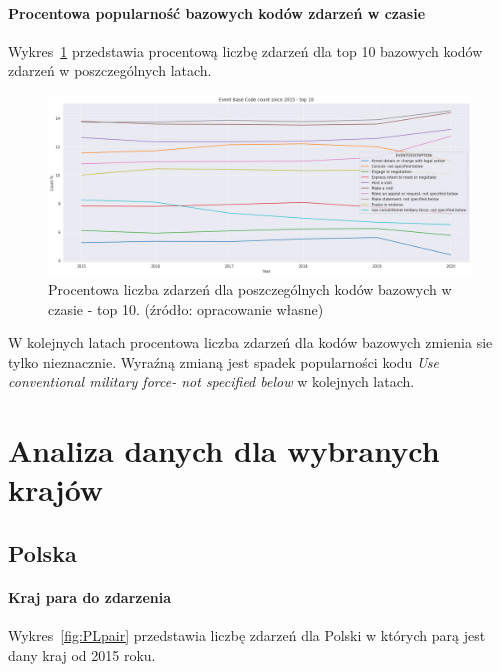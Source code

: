 \documentclass[11pt]{report}
\begin{document}
    \paragraph{Procentowa popularność bazowych kodów zdarzeń w czasie}
    Wykres~\ref{fig:GLOBALEBCperc} przedstawia procentową liczbę zdarzeń dla top 10 bazowych kodów zdarzeń w poszczególnych latach.
    \begin{figure}[!htp]
        \centering
        \includegraphics[width=\linewidth]{fig/GLOBAL/EBCperc.png}
        \caption{Procentowa liczba zdarzeń dla poszczególnych kodów bazowych w czasie - top 10. (źródło: opracowanie własne)}
        \label{fig:GLOBALEBCperc}
    \end{figure}
    W kolejnych latach procentowa liczba zdarzeń dla kodów bazowych zmienia sie tylko nieznacznie.
    Wyraźną zmianą jest spadek popularności kodu \textit{Use conventional military force- not specified below} w kolejnych latach.


    \section{Analiza danych dla wybranych krajów}\label{sec:analiza-danych-dla-wybranych-krajów}

    \subsection{Polska}

    \paragraph{Kraj para do zdarzenia}


    Wykres~\ref{fig:PLpair} przedstawia liczbę zdarzeń dla Polski w których parą jest dany kraj od 2015 roku.
\end{document}
